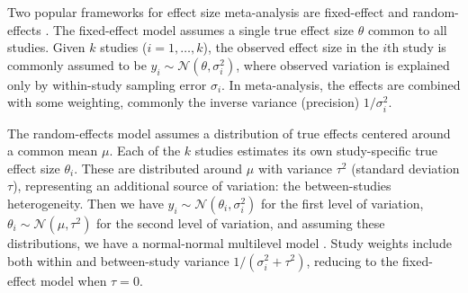 %
%
%

Two popular frameworks for effect size meta-analysis are fixed-effect and random-effects \autocite{cohn2003HowMetaanalysisIncreases,borenstein2010BasicIntroductionFixedeffect}.
The fixed-effect model assumes a single true effect size $\theta$ common to all studies.
Given $k$ studies ($i = 1, \dots, k$), the observed effect size in the $i$th 
study is commonly assumed to be $y_i \sim \mathcal{N}(\theta,\sigma^2_i)$, where observed variation is explained only by within-study sampling error $\sigma_i$.
In meta-analysis, the effects are combined with some weighting, commonly the inverse variance (precision) $1/\sigma^2_i$.

The random-effects model assumes a distribution of true effects centered around a common mean $\mu$.
Each of the $k$ studies estimates its own study-specific true effect size $\theta_i$.
These are distributed around $\mu$ with variance $\tau^2$ (standard deviation $\tau$), representing an additional source of variation: the between-studies heterogeneity.
Then we have 
$y_i \sim \mathcal{N}(\theta_i,\sigma^2_i)$ for the first level of variation,
$\theta_i \sim \mathcal{N}(\mu,\tau^2)$ for the second level of variation,
and assuming these distributions, we have a normal-normal multilevel model \autocite{rover2017BayesianRandomeffectsMetaanalysis}.
Study weights include both within and between-study variance $1/(\sigma^2_i + \tau^2)$, reducing to the fixed-effect model when $\tau=0$.

